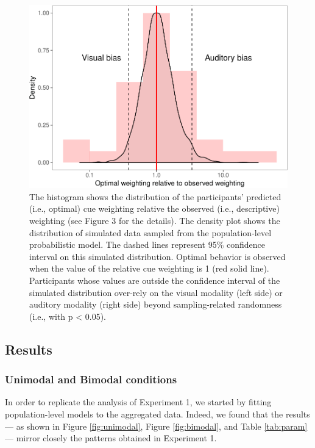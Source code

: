 \documentclass[english,,man,floatsintext]{apa6}
\theoremstyle{definition}
\theoremstyle{definition}
\theoremstyle{definition}
\theoremstyle{remark}
\begin{document}
\begin{figure}[!h]
\includegraphics[width=\textwidth]{ms_files/figure-latex/weights-1} \caption{The histogram shows the distribution of the participants' predicted (i.e., optimal) cue weighting relative the observed (i.e., descriptive) weighting (see Figure 3 for the details). The density plot shows the distribution of simulated data sampled from the population-level probabilistic model. The dashed lines represent 95\% confidence interval on this simulated distribution. Optimal behavior is observed when the value of the relative cue weighting is 1 (red solid line). Participants whose values are outside the confidence interval of the simulated distribution over-rely on the visual modality (left side) or auditory modality (right side) beyond sampling-related randomness (i.e., with p < 0.05).}\label{fig:weights}
\end{figure}

\subsection{Results}\label{results-2}

\subsubsection{Unimodal and Bimodal
conditions}\label{unimodal-and-bimodal-conditions}

In order to replicate the analysis of Experiment 1, we started by
fitting population-level models to the aggregated data. Indeed, we found
that the results --- as shown in Figure \ref{fig:unimodal}, Figure
\ref{fig:bimodal}, and Table \ref{tab:param} --- mirror closely the
patterns obtained in Experiment 1.
\end{document}
